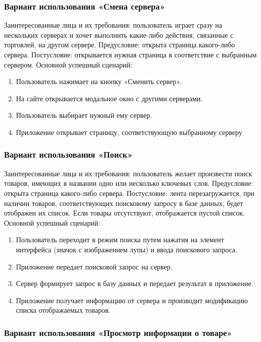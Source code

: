 \subsubsection{Вариант использования «Смена сервера»}

Заинтересованные лица и их требования: пользователь играет сразу на нескольких серверах и хочет выполнить какие-либо действия, связанные с торговлей, на другом сервере.
Предусловие: открыта страница какого-либо сервера.
Постусловие: открывается нужная страница в соответствие с выбранным сервером.
Основной успешный сценарий:
\begin{enumerate}
	\item Пользователь нажимает на кнопку «Сменить сервер».
	\item На сайте открывается модальное окно с другими серверами.
	\item Пользователь выбирает нужный ему сервер.
	\item Приложение открывает страницу, соответствующую выбранному серверу
\end{enumerate}

\subsubsection{Вариант использования «Поиск»}

Заинтересованные лица и их требования: пользователь желает произвести поиск товаров, имеющих в названии одно или несколько ключевых слов.
Предусловие: открыта страница какого-либо сервера.
Постусловие: лента перезагружается, при наличии товаров, соответствующих поисковому запросу в базе данных, будет отображен их список.
Если товары отсутствуют, отображается пустой список.
Основной успешный сценарий:
\begin{enumerate}
	\item Пользователь переходит в режим поиска путем нажатия на элемент интерфейса (значок с изображением лупы) и ввода поискового запроса.
	\item Приложение передает поисковой запрос на сервер.
	\item Сервер формирует запрос в базу данных и передает результат в приложение.
	\item Приложение получает информацию от сервера и производит модификацию списка отображаемых товаров.
\end{enumerate}

\subsubsection{Вариант использования «Просмотр информации о товаре»}

